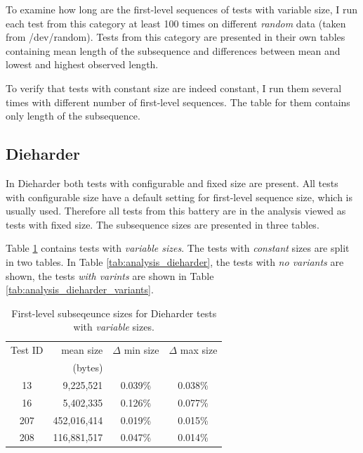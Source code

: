 \documentclass[
  digital,     %
  oneside,     %
  nosansbold,  %
  nocolorbold, %
  nolof,         %
  nolot,         %
]{fithesis4}
\begin{document}
To examine how long are the first-level sequences of tests with variable size, I run each test from this category at least 100 times on different \emph{random} data (taken from /dev/random). Tests from this category are presented in their own tables containing mean length of the subsequence and differences between mean and lowest and highest observed length.

To verify that tests with constant size are indeed constant, I run them several times with different number of first-level sequences. The table for them contains only length of the subsequence.



\subsection{Dieharder}

In Dieharder both tests with configurable and fixed size are present. All tests with configurable size have a default setting for first-level sequence size, which is usually used. Therefore all tests from this battery are in the analysis viewed as tests with fixed size. The subsequence sizes are presented in three tables.

Table \ref{tab:analysis_dieharder_variable} contains tests with \emph{variable sizes}. The tests with \emph{constant} sizes are split in two tables. In Table \ref{tab:analysis_dieharder}, the tests with \emph{no variants} are shown, the tests \emph{with varints} are shown in Table \ref{tab:analysis_dieharder_variants}.

\begin{table}[H]
  \begin{tabularx}{0.7\textwidth}{c|r|c|c}
    Test ID & mean size & $\Delta$ min size & $\Delta$ max size\\
     & (bytes) & & \\
    \midrule
    13 & 9,225,521 & 0.039\% & 0.038\%\\
    16 & 5,402,335 & 0.126\% & 0.077\%\\
    207 & 452,016,414 & 0.019\% & 0.015\%\\
    208 & 116,881,517 & 0.047\% & 0.014\%\\
 
  \end{tabularx}
  \caption{First-level subseqeunce sizes for Dieharder tests with \emph{variable} sizes.}
  \label{tab:analysis_dieharder_variable}
\end{table}
\end{document}

